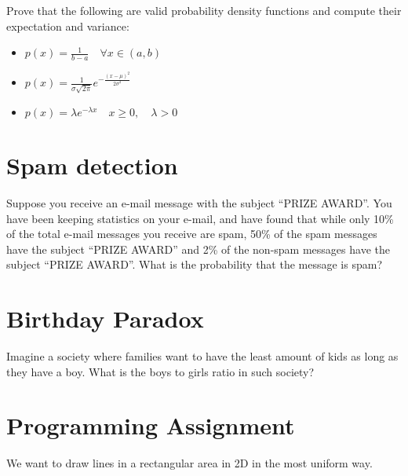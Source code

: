 \documentclass[11pt,oneside,a4paper]{article}
\theoremstyle{definition}
\DeclareRobustCommand{\[}{\begin{equation}}
\DeclareRobustCommand{\]}{\end{equation}}
\begin{document}
Prove that the following are valid probability density functions and compute their expectation and variance: 


\begin{itemize}
    \item   $ \displaystyle p(x) = \frac{1}{b-a} \quad \forall x \in (a,b) $
\item 
$ \displaystyle p(x) = \frac{1}{\sigma \sqrt{2\pi} } e^{-\frac{(x-\mu)^2}{2\sigma^2}}$

\item $ \displaystyle p(x) = \lambda e^{-\lambda x}  \quad x\geq 0, \quad \lambda >0 $
\end{itemize}


\section*{Spam detection}
Suppose you receive an e-mail message with the subject “PRIZE AWARD”. You have been keeping statistics on your e-mail, and have found that while only 10\% of the total e-mail messages you receive are spam, 50\% of the spam messages have the subject “PRIZE AWARD” and 2\% of the non-spam messages have the subject “PRIZE AWARD”. What is the probability that the message is spam?

\section*{Birthday Paradox} 
Imagine a society where families want to have the least amount of kids as long as they have a boy. What is the boys to girls ratio in such society? 









\section*{Programming Assignment} 

We want to draw lines in a rectangular area in 2D in the most uniform way. 
\end{document}
